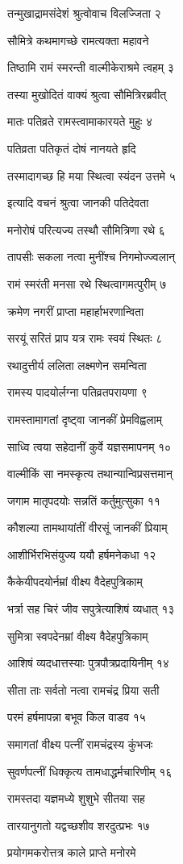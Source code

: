 तन्मुखाद्रामसंदेशं श्रुत्वोवाच विलज्जिता २

सौमित्रे कथमागच्छे रामत्यक्ता महावने

तिष्ठामि रामं स्मरन्ती वाल्मीकेराश्रमे त्वहम् ३

तस्या मुखोदितं वाक्यं श्रुत्वा सौमित्रिरब्रवीत्

मातः पतिव्रते रामस्त्वामाकारयते मुहुः ४

पतिव्रता पतिकृतं दोषं नानयते हृदि

तस्मादागच्छ हि मया स्थित्वा स्यंदन उत्तमे ५

इत्यादि वचनं श्रुत्वा जानकी पतिदेवता

मनोरोषं परित्यज्य तस्थौ सौमित्रिणा रथे ६

तापसीः सकला नत्वा मुनींश्च निगमोज्ज्वलान्

रामं स्मरंती मनसा रथे स्थित्वागमत्पुरीम् ७

क्रमेण नगरीं प्राप्ता महार्हाभरणान्विता

सरयूं सरितं प्राप यत्र रामः स्वयं स्थितः ८

रथादुत्तीर्य ललिता लक्ष्मणेन समन्विता

रामस्य पादयोर्लग्ना पतिव्रतपरायणा ९

रामस्तामागतां दृष्ट्वा जानकीं प्रेमविह्वलाम्

साध्वि त्वया सहेदानीं कुर्वे यज्ञसमापनम् १०

वाल्मीकिं सा नमस्कृत्य तथान्यान्विप्रसत्तमान्

जगाम मातृपदयोः सन्नतिं कर्तुमुत्सुका ११

कौशल्या तामथायांतीं वीरसूं जानकीं प्रियाम्

आशीर्भिरभिसंयुज्य ययौ हर्षमनेकधा १२

कैकेयीपदयोर्नम्रां वीक्ष्य वैदेहपुत्रिकाम्

भर्त्रा सह चिरं जीव सपुत्रेत्याशिषं व्यधात् १३

सुमित्रा स्वपदेनम्रां वीक्ष्य वैदेहपुत्रिकाम्

आशिषं व्यदधात्तस्याः पुत्रपौत्रप्रदायिनीम् १४

सीता ताः सर्वतो नत्वा रामचंद्र प्रिया सती

परमं हर्षमापन्ना बभूव किल वाडव १५

समागतां वीक्ष्य पत्नीं रामचंद्रस्य कुंभजः

सुवर्णपत्नीं धिक्कृत्य तामधाद्धर्मचारिणीम् १६

रामस्तदा यज्ञमध्ये शुशुभे सीतया सह

तारयानुगतो यद्वच्छशीव शरदुत्प्रभः १७

प्रयोगमकरोत्तत्र काले प्राप्ते मनोरमे

